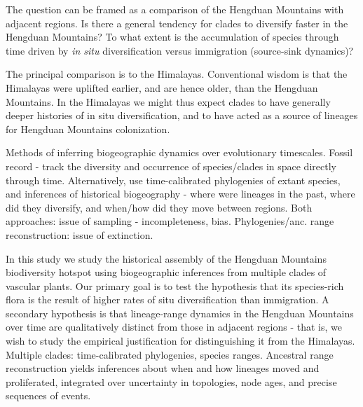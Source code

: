 The question can be framed as a comparison of the Hengduan Mountains with adjacent regions. Is there a general tendency for clades to diversify faster in the Hengduan Mountains? To what extent is the accumulation of species through time driven by \textit{in situ} diversification versus immigration (source-sink dynamics)?

The principal comparison is to the Himalayas. Conventional wisdom is that the Himalayas were uplifted earlier, and are hence older, than the Hengduan Mountains. In the Himalayas we might thus expect clades to have generally deeper histories of in situ diversification, and to have acted as a source of lineages for Hengduan Mountains colonization.

Methods of inferring biogeographic dynamics over evolutionary timescales. Fossil record - track the diversity and occurrence of species/clades in space directly through time. Alternatively, use time-calibrated phylogenies of extant species, and inferences of historical biogeography - where were lineages in the past, where did they diversify, and when/how did they move between regions. Both approaches: issue of sampling - incompleteness, bias. Phylogenies/anc. range reconstruction: issue of extinction.

In this study we study the historical assembly of the Hengduan Mountains biodiversity hotspot using biogeographic inferences from multiple clades of vascular plants. Our primary goal is to test the hypothesis that its species-rich flora is the result of higher rates of situ diversification than immigration. A secondary hypothesis is that lineage-range dynamics in the Hengduan Mountains over time are qualitatively distinct from those in adjacent regions - that is, we wish to study the empirical justification for distinguishing it from the Himalayas. Multiple clades: time-calibrated phylogenies, species ranges. Ancestral range reconstruction yields inferences about when and how lineages moved and proliferated, integrated over uncertainty in topologies, node ages, and precise sequences of events.